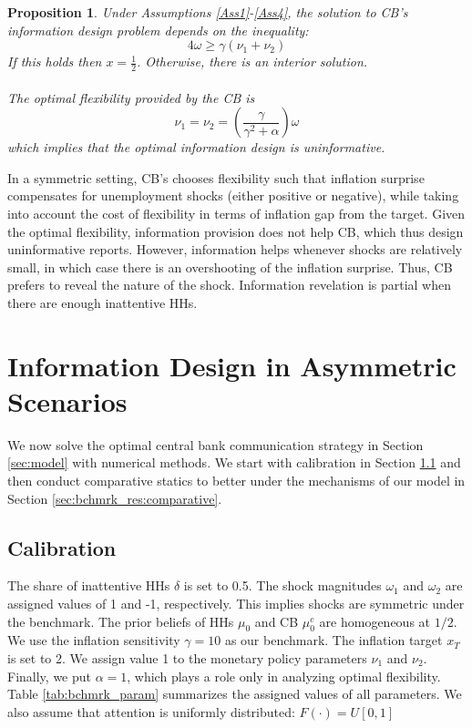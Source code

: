 \documentclass[12pt,a4paper]{article}
\newtheorem{proposition}{Proposition}
\begin{document}
\begin{proposition}
    \label{Prop3}
    Under Assumptions \ref{Ass1}-\ref{Ass4}, the solution to CB's information design problem depends on the inequality:
    \begin{equation}
    \label{threshold}
        4\omega\geq\gamma(\nu_1+\nu_2)
    \end{equation}
    If this holds then $x=\frac{1}{2}$. Otherwise, there is an interior solution. 
    \\
    \\
    The optimal flexibility provided by the CB is
    \begin{equation}
        \nu_1=\nu_2=\left(\frac{\gamma}{\gamma^2+\alpha}\right)\omega
    \end{equation}
    which implies that the optimal information design is uninformative.
\end{proposition}
In a symmetric setting, CB's chooses flexibility such that inflation surprise compensates for unemployment shocks (either positive or negative), while taking into account the cost of flexibility in terms of inflation gap from the target. Given the optimal flexibility, information provision does not help CB, which thus design uninformative reports. However, information helps whenever shocks are relatively small, in which case there is an overshooting of the inflation surprise. Thus, CB prefers to reveal the nature of the shock. Information revelation is partial when there are enough inattentive HHs.

\section{Information Design in Asymmetric Scenarios} \label{sec:bchmrk_res}

We now solve the optimal central bank communication strategy in Section \ref{sec:model} with numerical methods. We start with calibration in Section \ref{sec:bchmrk_res:calibration} and then conduct comparative statics to better under the mechanisms of our model in Section \ref{sec:bchmrk_res:comparative}.

\subsection{Calibration} \label{sec:bchmrk_res:calibration}
The share of inattentive HHs $\delta$ is set to 0.5. The shock magnitudes $\omega_1$ and $\omega_2$ are assigned values of 1 and -1, respectively. This implies shocks are symmetric under the benchmark. The prior beliefs of HHs $\mu_0$ and CB $\mu_0^c$ are homogeneous at $1/2$. We use the inflation sensitivity $\gamma=10$ as our benchmark. The inflation target $x_T$ is set to 2. We assign value 1 to the monetary policy parameters $\nu_1$ and $\nu_2$. Finally, we put $\alpha=1$, which plays a role only in analyzing optimal flexibility. Table \ref{tab:bchmrk_param} summarizes the assigned values of all parameters. We also assume that attention is uniformly distributed: $F(\cdot)=U[0,1]$
\end{document}
